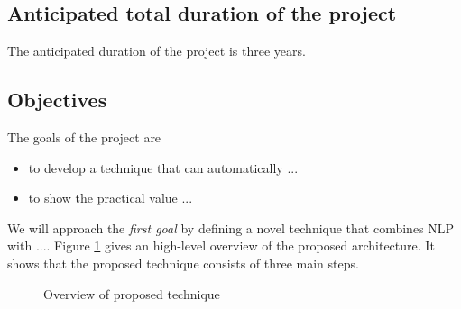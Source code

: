 \documentclass{scrartcl}
\begin{document}
\subsection{Anticipated total duration of the project}

The anticipated duration of the project is three years.

\subsection{Objectives}
\label{sec:objectives}

The goals of the project are

\begin{itemize}
\item to develop a technique that can automatically ...   

\item to show the practical value ... 
\end{itemize}

We will approach the \textit{first goal} by defining a novel technique that combines NLP with .... Figure \ref{fig:approach} gives an high-level overview of the proposed architecture. It shows that the proposed technique consists of three main steps.   

\begin{figure}[h!]
\centering

\caption{Overview of proposed technique}
\label{fig:approach}
\end{figure}
\end{document}
